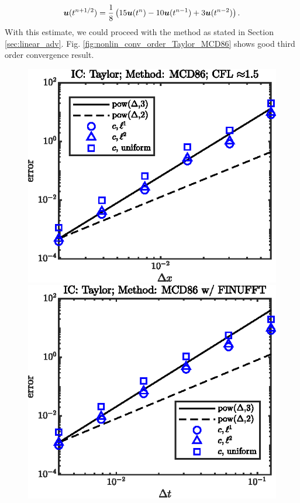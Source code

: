 \documentclass[11pt,letterpaper]{article}
\begin{document}
\begin{align*}
    \boldsymbol{u}(t^{n+1/2}) = \frac{1}{8}\left(15\boldsymbol{u}(t^n)-10\boldsymbol{u}(t^{n-1})+3\boldsymbol{u}(t^{n-2})\right). 
\end{align*}
With this estimate, we could proceed with the method as stated in Section \ref{sec:linear_adv}. Fig. \ref{fig:nonlin_conv_order_Taylor_MCD86} shows good third order convergence result.
\begin{figure}[H]
    \centering
    \includegraphics{figs/nonlin_conv_order_Taylor_MCD86}
    \includegraphics{figs/nonlin_conv_order_Taylor_finu_MCD86}

\end{figure}
\end{document}
